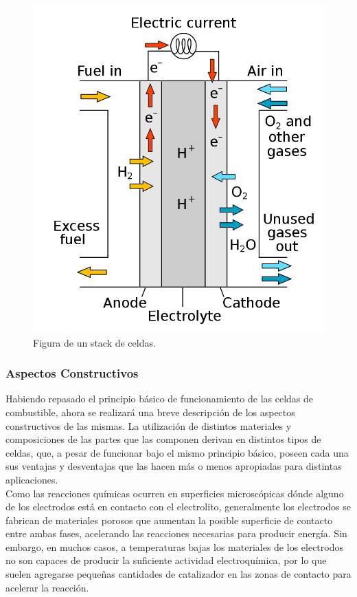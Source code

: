 \begin{figure}[h]
    \centering
    \includegraphics[scale=0.2]{Imagenes/Fuel Cell.png}
    \caption{Figura de un stack de celdas.}
    \label{fuel_cell_stack}
\end{figure}

\subsubsection{Aspectos Constructivos}

Habiendo repasado el principio básico de funcionamiento de las celdas de combustible, ahora se realizará una breve descripción de los aspectos constructivos de las mismas. La utilización de distintos materiales y composiciones de las partes que las componen derivan en distintos tipos de celdas, que, a pesar de funcionar bajo el mismo principio básico, poseen cada una sus ventajas y desventajas que las hacen más o menos apropiadas para distintas aplicaciones.\\

Como las reacciones químicas ocurren en superficies microscópicas dónde alguno de los electrodos está en contacto con el electrolito, generalmente los electrodos se fabrican de materiales porosos que aumentan la posible superficie de contacto entre ambas fases, acelerando las reacciones necesarias para producir energía. Sin embargo, en muchos casos, a temperaturas bajas los materiales de los electrodos no son capaces de producir la suficiente actividad electroquímica, por lo que suelen agregarse pequeñas cantidades de catalizador en las zonas de contacto para acelerar la reacción.\\

